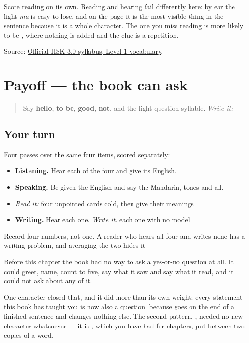 Score reading on its own. Reading and hearing fail differently here: by ear the light \emph{ma} is easy to lose, and on the page it is the most visible thing in the sentence because it is a whole character. The one you miss reading is more likely to be , where nothing is added and the clue is a repetition.

\begin{tcolorbox}[breakable,colback=teal!4,colframe=teal!35!black,title={Before you move on}]
Source: \href{https://hsk.cn-bj.ufileos.com/3.0/\%E6\%96\%B0\%E7\%89\%88HSK\%E8\%80\%83\%E8\%AF\%95\%E5\%A4\%A7\%E7\%BA\%B21219.pdf}{Official HSK 3.0 syllabus, Level 1 vocabulary}.
\end{tcolorbox}
\section[Practice]{Payoff — the book can ask}

\label{lesson:ZH-C19-practice}



\begin{quote}
Say \textbf{hello}, \textbf{to be}, \textbf{good}, \textbf{not}, and the light question syllable. \emph{Write it:} \textbf{}
\end{quote}

\subsection*{Your turn}
Four passes over the same four items, scored separately:

\begin{itemize}
\raggedright
  \item \textbf{Listening.} Hear each of the four and give its English.
  \item \textbf{Speaking.} Be given the English and say the Mandarin, tones and all.
  \item \emph{Read it:} four unpointed cards cold, then give their meanings
  \item \textbf{Writing.} Hear each one. \emph{Write it:} each one with no model
\end{itemize}

Record four numbers, not one. A reader who hears all four and writes none has a writing problem, and averaging the two hides it.

\begin{grammarlens}[title={What you've built}]
Before this chapter the book had no way to ask a yes-or-no question at all. It could greet, name, count to five, say what it saw and say what it read, and it could not ask about any of it.

One character closed that, and it did more than its own weight: every statement this book has taught you is now also a question, because  goes on the end of a finished sentence and changes nothing else. The second pattern, , needed no new character whatsoever — it is , which you have had for chapters, put between two copies of a word.
\end{grammarlens}


